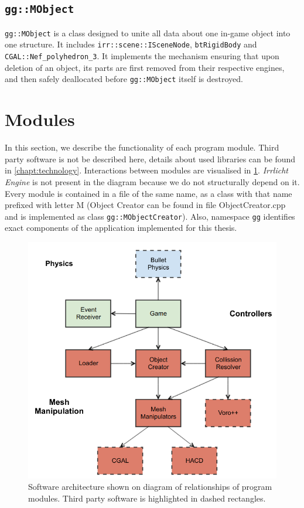 \subsection*{\tt gg::MObject} 
{\tt gg::MObject} is a class designed to unite all data about one in-game object into one structure. It includes {\tt irr::scene::ISceneNode}, {\tt btRigidBody} and {\tt CGAL::Nef\_polyhedron\_3}. It implements the mechanism ensuring that upon deletion of an object, its parts are first removed from their respective engines, and then safely deallocated before {\tt gg::MObject} itself is destroyed.


\section{Modules}
In this section, we describe the functionality of each program module. Third party software is not be described here, details about used libraries can be found in \cref{chapt:technology}. Interactions between modules are visualised in \cref{fig:modules}. \emph{Irrlicht Engine} is not present in the diagram because we do not structurally depend on it. Every module is contained in a file of the same name, as a class with that name prefixed with letter M (\ie Object Creator can be found in file ObjectCreator.cpp and is implemented as class {\tt gg::MObjectCreator}). Also, namespace {\tt gg} identifies exact components of the application implemented for this thesis.

\begin{figure}
        \centering
        \includegraphics[width=\textwidth]{img/objectmodel}
        \caption{Software architecture shown on diagram of relationships of program modules. Third party software is highlighted in dashed rectangles.}
        \label{fig:modules}
\end{figure}


